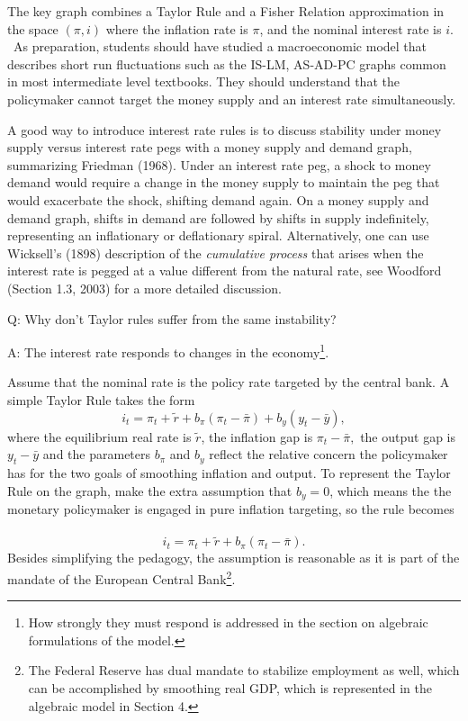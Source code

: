 \documentclass{article}
\begin{document}
\begin{doublespace}
The key graph combines a Taylor Rule and a Fisher Relation approximation in
the space $\left( \pi ,i\right) $ where the inflation rate is $\pi $, and
the nominal interest rate is $i$. \ As preparation, students should have
studied a macroeconomic model that describes short run fluctuations such as
the IS-LM, AS-AD-PC graphs common in most intermediate level textbooks. They
should understand that the policymaker cannot target the money supply and an
interest rate simultaneously.

A good way to introduce interest rate rules is to discuss stability under
money supply versus interest rate pegs with a money supply and demand graph,
summarizing Friedman (1968). Under an interest rate peg, a shock to money
demand would require a change in the money supply to maintain the peg that
would exacerbate the shock, shifting demand again. On a money supply and
demand graph, shifts in demand are followed by shifts in supply
indefinitely, representing an inflationary or deflationary spiral.
Alternatively, one can use Wicksell's (1898) description of the \textit{%
cumulative process} that arises when the interest rate is pegged at a value
different from the natural rate, see Woodford (Section 1.3, 2003) for a more
detailed discussion.

Q: Why don't Taylor rules suffer from the same instability?

A: The interest rate responds to changes in the economy\footnote{%
How strongly they must respond is addressed in the section on algebraic
formulations of the model.}.

Assume that the nominal rate is the policy rate targeted by the central
bank. A simple Taylor Rule takes the form%
\begin{equation}
i_{t}=\pi _{t}+\widetilde{r}+b_{\pi }\left( \pi _{t}-\bar{\pi}\right)
+b_{y}\left( y_{t}-\bar{y}\right) ,  \label{TR}
\end{equation}%
where the equilibrium real rate is $\widetilde{r}$, the inflation gap is $%
\pi _{t}-\bar{\pi},$ the output gap is $y_{t}-\bar{y}$ and the parameters $%
b_{\pi }$ and $b_{y}$ reflect the relative concern the policymaker has for
the two goals of smoothing inflation and output. To represent the Taylor
Rule on the graph, make the extra assumption that $b_{y}=0$, which means the
the monetary policymaker is engaged in pure inflation targeting, so the rule
becomes \ 
\begin{equation}
i_{t}=\pi _{t}+\widetilde{r}+b_{\pi }\left( \pi _{t}-\bar{\pi}\right) .
\label{TR infl}
\end{equation}%
Besides simplifying the pedagogy, the assumption is reasonable as it is part
of the mandate of the European Central Bank\footnote{%
The Federal Reserve has dual mandate to stabilize employment as well, which
can be accomplished by smoothing real GDP, which is represented in the
algebraic model in Section 4.}.


\end{doublespace}
\end{document}
